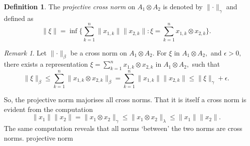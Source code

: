 \documentclass{article}
\theoremstyle{plain}
\theoremstyle{definition}
\newtheorem{definition}[theorem]{Definition}
\theoremstyle{remark}
\newtheorem{remark}[theorem]{Remark}
\begin{document}
\begin{definition}
	The \emph{projective cross norm} on $A_1 \otimes A_2$ is denoted by 
	$\lVert \cdot \rVert_\gamma$ and defined as
	$$\lVert \xi \rVert = \inf \{ \sum_{k=1}^{n} \lVert x_{1,k} \rVert \lVert x_{2,k} \rVert
	\colon \xi = \sum_{k=1}^{n} x_{1,k} \otimes x_{2,k} \}.$$
\end{definition}

\begin{remark}
	Let $\lVert \cdot \rVert_\beta$ be a cross norm on $A_1 \otimes A_2.$ 
	For $\xi$ in $A_1 \otimes A_2,$ and $\epsilon>0,$ there exists a representation
	$\xi = \sum_{k=1}^{n} x_{1,k} \otimes x_{2,k}$ in $A_1 \otimes A_2,$ such that
	\[
		\lVert \xi \rVert_\beta \leq
		\sum_{k=1}^{n} \lVert x_{1,k} \otimes x_{2,k} \rVert_\beta
		= \sum_{k=1}^{n} \lVert x_{1,k} \rVert \lVert x_{2,k} \rVert
		\leq \lVert \xi \rVert_\gamma + \epsilon.
	\]
\end{remark}
So, the projective norm majorises all cross norms. 
That it is itself a cross norm is evident from the computation
$$ \lVert x_1 \rVert \lVert x_2 \rVert = 
\lVert x_1 \otimes x_2 \rVert_\gamma \leq \lVert x_1 \otimes x_2 \rVert_\lambda \leq \lVert x_1 \rVert \lVert x_2 \rVert.$$
The same computation reveals that all norms `between' the two norms are cross norms.
projective norm
\end{document}
